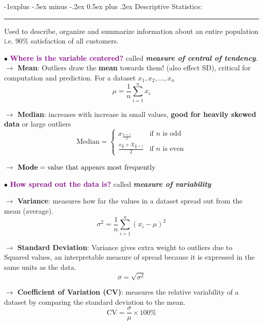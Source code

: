 \documentclass[letterpaper, 10.5pt,landscape]{article}
\makeatletter
\renewcommand{\subsection}{\@startsection{subsection}{2}{0mm}%
                                {-1explus -.5ex minus -.2ex}%
                                {0.5ex plus .2ex}%
                                {\normalfont\normalsize\bfseries}}
\makeatother
\begin{document}
\begin{multicols*}{3}
\subsection{Descriptive Statistics:} {\color{teal}\hrule height 0.5pt} \smallskip

Used to describe, organize and summarize information about an entire population i.e. 90\% satisfaction of all customers.

$\bullet$ \textbf{\textcolor{purple}{Where is the variable centered?}} called \textit{\textbf{measure of central of tendency}}.\\

$\rightarrow$ \textbf{Mean}: Outliers draw the \textbf{mean} towards them! (also effect SD), critical for computation and prediction. For a dataset $x_1, x_2, \dots, x_n$
\vspace{-3pt}
\[\boxed{\mu = \frac{1}{n} \sum_{i=1}^{n} x_i}\]
 \vspace{-3pt}


$\rightarrow$ \textbf{Median}: increases with increase in small values, \textbf{good for heavily skewed data} or large outliers
\vspace{-3pt}
\[
\boxed{\text{Median} = 
\begin{cases} 
x_{\frac{n+1}{2}} & \text{if } n \text{ is odd} \\
\frac{x_{\frac{n}{2}} + X_{\frac{n}{2} + 1}}{2} & \text{if } n \text{ is even}
\end{cases}}
\]
\vspace{-3pt}

$\rightarrow$ \(\text{\textbf{Mode}} = \text{value that appears most frequently}\)

\vspace{5pt}
$\bullet$ \textbf{\textcolor{purple}{How spread out the data is?}} called \textit{\textbf{measure of variability}} 


$\rightarrow$ \textbf{Variance}: measures how far the values in a dataset spread out from the mean (average).
\vspace{-3pt}
\[
\boxed{
\sigma^2 = \frac{1}{n} \sum_{i=1}^{n} (x_i - \mu)^2
}
\]

$\rightarrow$ \textbf{Standard Deviation}: Variance gives extra weight to outliers due to Squared values, an interpretable measure of spread because it is expressed in the same units as the data.
\vspace{-3pt}
\[
\boxed{
\sigma = \sqrt{\sigma^2}
}
\]

$\rightarrow$ \textbf{Coefficient of Variation (CV)}: measures the relative variability of a dataset by comparing the standard deviation to the mean.
\vspace{-3pt}
\[\boxed{\text{CV} = \frac{\sigma}{\mu} \times 100\%}\]



\end{multicols*}
\end{document}

